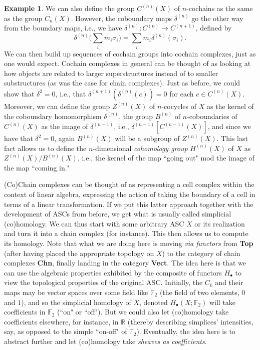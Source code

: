 \documentclass[a4paper]{book}
\theoremstyle{definition}
\newtheorem{example}{Example}[section]
\theoremstyle{definition}
\theoremstyle{definition}
\theoremstyle{theorem}
\theoremstyle{definition}
\begin{document}
\begin{example}
	We can also define the group $C^{(n)}(X)$ of $n$-cochains as the same as the group $C_n(X)$. However, the coboundary maps $\delta^{(n)}$ go the other way from the boundary maps, i.e., we have $\delta^{(n)}: C^{(n)} \rightarrow C^{(n+1)}$, defined by 
	\begin{equation}
	\delta^{(n)} \Big(\sum_i m_i \sigma_i \Big) = \sum_i m_i \delta^{(n)}(\sigma_i).
	\end{equation}   
	 We can then build up sequences of cochain groups into cochain complexes, just as one would expect. Cochain complexes in general can be thought of as looking at how objects are related to larger superstructures instead of to smaller substructures (as was the case for chain complexes). Just as before, we could show that $\delta^2 = 0$, i.e., that $\delta^{(n+1)}(\delta^{(n)}(c))= 0$ for each $c \in C^{(n)}(X)$. Moreover, we can define the group $Z^{(n)}(X)$ of $n$-cocycles of $X$ as the kernel of the coboundary homomorphism $\delta^{(n)}$, the group $B^{(n)}$ of $n$-coboundaries of $C^{(n)}(X)$ as the image of $\delta^{(n-1)}$, i.e., $\delta^{(n-1)}[C^{(n-1)}(X)]$, and since we have that $\delta^2 = 0$, again $B^{(n)}(X)$ will be a subgroup of $Z^{(n)}(X)$. This last fact allows us to define the $n$-dimensional \textit{cohomology group} $H^{(n)}(X)$ of $X$ as $Z^{(n)}(X)/B^{(n)}(X)$, i.e., the kernel of the map ``going out" mod the image of the map ``coming in." \par 
	 (Co)Chain complexes can be thought of as representing a cell complex within the context of linear algebra, expressing the action of taking the boundary of a cell in terms of a linear transformation. If we put this latter approach together with the development of ASCs from before, we get what is usually called simplicial (co)homology. We can thus start with some arbitrary ASC $X$ or its realization and turn it into a chain complex (for instance). This then allows us to compute its homology. Note that what we are doing here is moving \textit{via functors} from \textbf{Top} (after having placed the appropriate topology on $X$) to the category of chain complexes \textbf{Chn}, finally landing in the category \textbf{Vect}. The idea here is that we can use the algebraic properties exhibited by the composite of functors $H_{\bullet}$ to view the topological properties of the original ASC. Initially, the $C_k$ and their maps may be vector spaces over some field like $\mathbb{F}_2$ (the field of two elements, $0$ and $1$), and so the simplicial homology of $X$, denoted $H_{\bullet}(X; \mathbb{F}_2)$ will take coefficients in $\mathbb{F}_2$ (``on" or ``off"). But we could also let (co)homology take coefficients elsewhere, for instance, in $\mathbb{R}$ (thereby describing simplices' intensities, say, as opposed to the simple ``on-off" of $\mathbb{F}_2$). Eventually, the idea here is to abstract further and let (co)homology take \textit{sheaves as coefficients}.\par  

\end{example}
\end{document}
